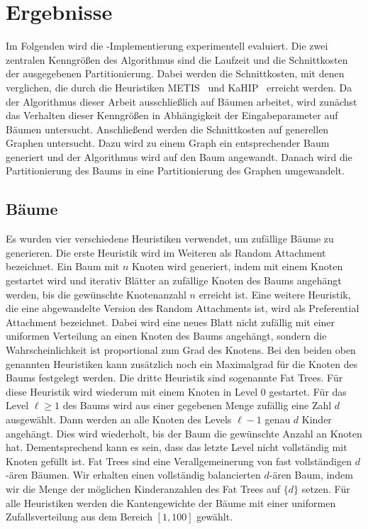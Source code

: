
\chapter{Ergebnisse}\label{chapter:ergebnisse}
Im Folgenden wird die \Cpp\hyp Implementierung experimentell evaluiert.
Die zwei zentralen Kenngrößen des Algorithmus sind die Laufzeit und die Schnittkosten der ausgegebenen Partitionierung.
Dabei werden die Schnittkosten, mit denen verglichen, die durch die Heuristiken METIS~\cite{KK98} und KaHIP~\cite{SS13} erreicht werden.
Da der Algorithmus dieser Arbeit ausschließlich auf Bäumen arbeitet, wird zunächst das Verhalten dieser Kenngrößen in Abhängigkeit der Eingabeparameter auf Bäumen untersucht.
Anschließend werden die Schnittkosten auf generellen Graphen untersucht.
Dazu wird zu einem Graph ein entsprechender Baum generiert und der Algorithmus wird auf den Baum angewandt.
Danach wird die Partitionierung des Baums in eine Partitionierung des Graphen umgewandelt.

\section{Bäume}
Es wurden vier verschiedene Heuristiken verwendet, um zufällige Bäume zu generieren.
Die erste Heuristik wird im Weiteren als Random Attachment bezeichnet. 
Ein Baum mit $n$ Knoten wird generiert, indem mit einem Knoten gestartet wird und iterativ Blätter an zufällige Knoten des Baums angehängt werden, bis die gewünschte Knotenanzahl $n$ erreicht ist.
Eine weitere Heuristik, die eine abgewandelte Version des Random Attachments ist, wird als Preferential Attachment bezeichnet.
Dabei wird eine neues Blatt nicht zufällig mit einer uniformen Verteilung an einen Knoten des Baums angehängt, sondern die Wahrscheinlichkeit ist proportional zum Grad des Knotens.
Bei den beiden oben genannten Heuristiken kann zusätzlich noch ein Maximalgrad für die Knoten des Baums festgelegt werden.
Die dritte Heuristik sind sogenannte Fat Trees.
Für diese Heuristik wird wiederum mit einem Knoten in Level $0$ gestartet.
Für das Level $\ell \geq 1$ des Baums wird aus einer gegebenen Menge zufällig eine Zahl $d$ ausgewählt.
Dann werden an alle Knoten des Levels $\ell - 1$ genau $d$ Kinder angehängt.
Dies wird wiederholt, bis der Baum die gewünschte Anzahl an Knoten hat. 
Dementsprechend kann es sein, dass das letzte Level nicht vollständig mit Knoten gefüllt ist.
Fat Trees sind eine Verallgemeinerung von fast vollständigen $d$\hyp ären Bäumen.
Wir erhalten einen vollständig balancierten $d$\hyp ären Baum, indem wir die Menge der möglichen Kinderanzahlen des Fat Trees auf $\{d\}$ setzen.
Für alle Heuristiken werden die Kantengewichte der Bäume mit einer uniformen Zufallsverteilung aus dem Bereich $[1, 100]$ gewählt.

